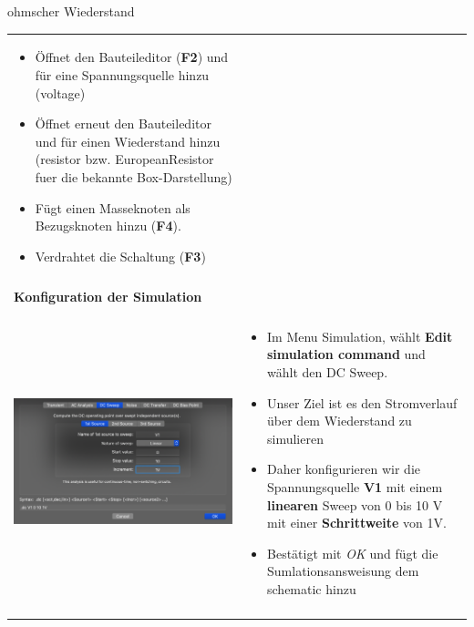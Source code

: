 \begin{frame}[t]{ohmscher Wiederstand}
\begin{spacing}{0.9}
\begin{tiny}
\begin{table}[h!]
\begin{tabular}{p{3cm} p{7cm}}
\begin{minipage}{.7\textwidth}
\begin{itemize}
          \item Öffnet den Bauteileditor (\textbf{F2}) und für eine Spannungsquelle hinzu (voltage)
          \item Öffnet erneut den Bauteileditor und für einen Wiederstand hinzu (resistor bzw. EuropeanResistor fuer die bekannte Box-Darstellung)
          \item Fügt einen Masseknoten als Bezugsknoten hinzu (\textbf{F4}).
          \item Verdrahtet die Schaltung (\textbf{F3})
        \end{itemize}
        \end{minipage} 
        \\
         & \\
         \hline
         \textbf{Konfiguration der Simulation} & \\
         \hline \\
         \begin{minipage}{.3\textwidth}
          \includegraphics[width=\linewidth]{pictures/simulationcmd_1.png}
        \end{minipage} 
        & 
        \begin{minipage}{.7\textwidth}
        \begin{itemize}
          \item Im Menu Simulation, wählt \textbf{Edit simulation command} und wählt den DC Sweep. 
          \item Unser Ziel ist es den Stromverlauf über dem Wiederstand zu simulieren
          \item Daher konfigurieren wir die Spannungsquelle \textbf{V1} mit einem \textbf{linearen} Sweep von 0 bis 10 V mit einer \textbf{Schrittweite} von 1V.
          \item Bestätigt mit \textit{OK} und fügt die Sumlationsansweisung dem schematic hinzu
        \end{itemize}
        \end{minipage} 
        \\
         & \\
         \hline
      \end{tabular}
    

\end{table}
\end{tiny}
\end{spacing}
\end{frame}
